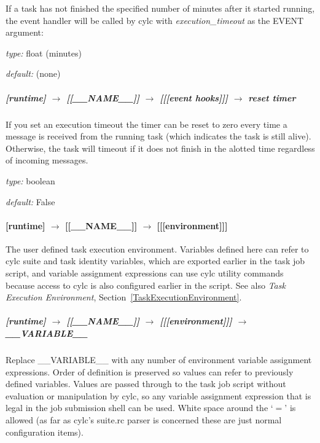 If a task has not finished the specified number of minutes after it
started running, the event handler will be called by cylc with {\em
execution\_timeout} as the EVENT argument:
\begin{myitemize}
    \item {\em type:} float (minutes)
    \item {\em default:} (none)
\end{myitemize}

\subparagraph[reset timer]{[runtime] $\rightarrow$ [[\_\_NAME\_\_]] $\rightarrow$ [[[event hooks]]] $\rightarrow$ reset timer}

If you set an execution timeout the timer can be reset to zero every
time a message is received from the running task (which indicates the 
task is still alive).  Otherwise, the task will timeout if it does not
finish in the alotted time regardless of incoming messages.

\begin{myitemize}
\item {\em type:} boolean
\item {\em default:} False
\end{myitemize}

\paragraph[{[[[}environment{]]]}]{[runtime] $\rightarrow$ [[\_\_NAME\_\_]] $\rightarrow$ [[[environment]]]}

The user defined task execution environment. Variables defined here can
refer to cylc suite and task identity variables, which are exported
earlier in the task job script, and variable assignment expressions can
use cylc utility commands because access to cylc is also configured
earlier in the script.  See also {\em Task Execution Environment},
Section~\ref{TaskExecutionEnvironment}.

\subparagraph[\_\_VARIABLE\_\_ ]{[runtime] $\rightarrow$ [[\_\_NAME\_\_]] $\rightarrow$ [[[environment]]] $\rightarrow$ \_\_VARIABLE\_\_}
\label{AppendixTaskExecutionEnvironment}

Replace \_\_VARIABLE\_\_ with any number of environment variable
assignment expressions.
Order of definition is preserved so values can refer to previously
defined variables. Values are passed through to the task job script
without evaluation or manipulation by cylc, so any variable assignment
expression that is legal in the job submission shell can be used. 
White space around the `$=$' is allowed (as far as cylc's suite.rc 
parser is concerned these are just normal configuration items).

